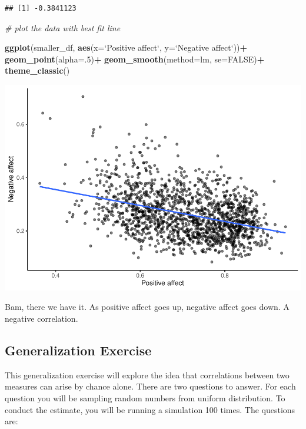 \documentclass[]{book}
\newenvironment{Shaded}{\begin{snugshade}}{\end{snugshade}}
\newcommand{\KeywordTok}[1]{\textcolor[rgb]{0.13,0.29,0.53}{\textbf{#1}}}
\newcommand{\DataTypeTok}[1]{\textcolor[rgb]{0.13,0.29,0.53}{#1}}
\newcommand{\DecValTok}[1]{\textcolor[rgb]{0.00,0.00,0.81}{#1}}
\newcommand{\StringTok}[1]{\textcolor[rgb]{0.31,0.60,0.02}{#1}}
\newcommand{\CommentTok}[1]{\textcolor[rgb]{0.56,0.35,0.01}{\textit{#1}}}
\newcommand{\OtherTok}[1]{\textcolor[rgb]{0.56,0.35,0.01}{#1}}
\newcommand{\OperatorTok}[1]{\textcolor[rgb]{0.81,0.36,0.00}{\textbf{#1}}}
\newcommand{\NormalTok}[1]{#1}
\begin{document}
\begin{verbatim}
## [1] -0.3841123
\end{verbatim}

\begin{Shaded}
\begin{Highlighting}[]
\CommentTok{# plot the data with best fit line}

\KeywordTok{ggplot}\NormalTok{(smaller_df, }\KeywordTok{aes}\NormalTok{(}\DataTypeTok{x=}\StringTok{`}\DataTypeTok{Positive affect}\StringTok{`}\NormalTok{,}
                     \DataTypeTok{y=}\StringTok{`}\DataTypeTok{Negative affect}\StringTok{`}\NormalTok{))}\OperatorTok{+}
\StringTok{  }\KeywordTok{geom_point}\NormalTok{(}\DataTypeTok{alpha=}\NormalTok{.}\DecValTok{5}\NormalTok{)}\OperatorTok{+}
\StringTok{  }\KeywordTok{geom_smooth}\NormalTok{(}\DataTypeTok{method=}\NormalTok{lm, }\DataTypeTok{se=}\OtherTok{FALSE}\NormalTok{)}\OperatorTok{+}
\StringTok{  }\KeywordTok{theme_classic}\NormalTok{()}
\end{Highlighting}
\end{Shaded}

\includegraphics{Statistics_Lab_files/figure-latex/unnamed-chunk-75-1.pdf}

Bam, there we have it. As positive affect goes up, negative affect goes
down. A negative correlation.

\subsection{Generalization Exercise}\label{generalization-exercise-2}

This generalization exercise will explore the idea that correlations
between two measures can arise by chance alone. There are two questions
to answer. For each question you will be sampling random numbers from
uniform distribution. To conduct the estimate, you will be running a
simulation 100 times. The questions are:
\end{document}

